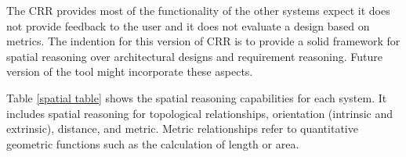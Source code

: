 \documentclass[12pt]{ucthesis}
\begin{document}
\begin{table}[t]
  \begin{center}
  \end{center}
\caption{Functionality}
\label{functionality table}
\end{table} 

The CRR provides most of the functionality of the other systems expect it does not provide feedback to the user and it does not evaluate a design based on metrics. The indention for this version of CRR is to provide a solid framework for spatial reasoning over architectural designs and requirement reasoning. Future version of the tool might incorporate these aspects. 

Table \ref{spatial table} shows the spatial reasoning capabilities for each system. It includes spatial reasoning for topological relationships, orientation (intrinsic and extrinsic), distance, and metric. Metric relationships refer to quantitative geometric functions such as the calculation of length or area.  

\begin{table}[H]
  \begin{center}
  \end{center}
\caption{Spatial Reasoning}
\label{spatial table}
\end{table}
\end{document}
